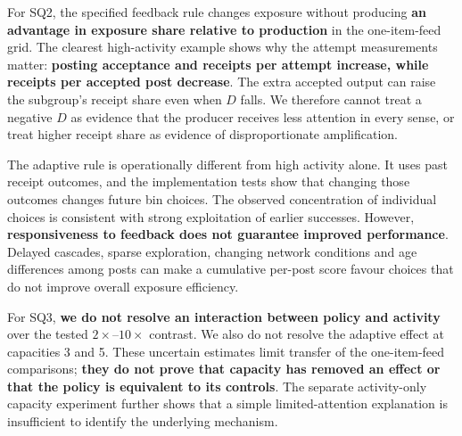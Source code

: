 For SQ2, the specified feedback rule changes exposure without producing \textbf{an advantage in exposure share relative to production} in the one-item-feed grid. The clearest high-activity example shows why the attempt measurements matter: \textbf{posting acceptance and receipts per attempt increase, while receipts per accepted post decrease}. The extra accepted output can raise the subgroup's receipt share even when \(D\) falls. We therefore cannot treat a negative \(D\) as evidence that the producer receives less attention in every sense, or treat higher receipt share as evidence of disproportionate amplification.

The adaptive rule is operationally different from high activity alone. It uses past receipt outcomes, and the implementation tests show that changing those outcomes changes future bin choices. The observed concentration of individual choices is consistent with strong exploitation of earlier successes. However, \textbf{responsiveness to feedback does not guarantee improved performance}. Delayed cascades, sparse exploration, changing network conditions and age differences among posts can make a cumulative per-post score favour choices that do not improve overall exposure efficiency.

For SQ3, \textbf{we do not resolve an interaction between policy and activity} over the tested \(2\times\)--\(10\times\) contrast. We also do not resolve the adaptive effect at capacities 3 and 5. These uncertain estimates limit transfer of the one-item-feed comparisons; \textbf{they do not prove that capacity has removed an effect or that the policy is equivalent to its controls}. The separate activity-only capacity experiment further shows that a simple limited-attention explanation is insufficient to identify the underlying mechanism.

